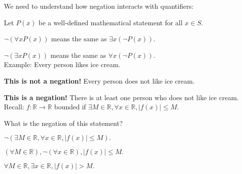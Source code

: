 \documentclass[a4paper, 11pt, twoside]{article}
\begin{document}
We need to understand how negation interacts with quantifiers:

Let $P(x)$ be a well-defined mathematical statement for all $x \in S.$

$\neg(\forall x P(x))$ means the same as $\exists x (\neg P(x)).$

$\neg(\exists x P(x))$ means the same as $\forall x (\neg P(x)).$\\

Example: Every person likes ice cream.

\textbf{This is not a negation!} Every person does not like ice cream.

\textbf{This is a negation!} There is at least one person who does not like ice cream.\\

Recall: $f:\mathbb{R}\rightarrow\mathbb{R}$ bounded if $\exists M\in \mathbb{R}, \forall x \in\mathbb{R}, |f(x)|\leq M.$

What is the negation of this statement?

$\neg(\exists M\in\mathbb{R}, \forall x \in\mathbb{R}, |f(x)|\leq M).$

$(\forall M\in\mathbb{R}), \neg(\forall x\in\mathbb{R}), |f(x)|\leq M.$

$\forall M\in\mathbb{R}, \exists x\in\mathbb{R}, |f(x)| > M.$
\end{document}
